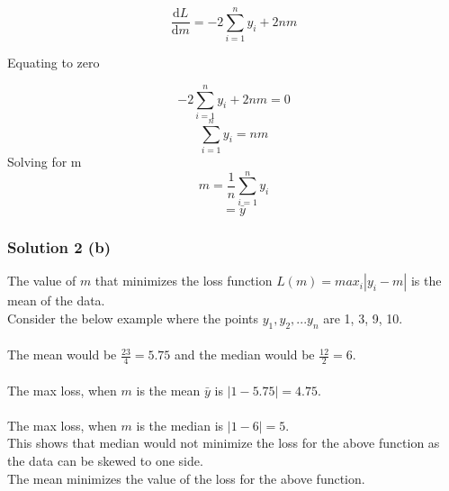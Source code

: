 \documentclass{assignment}
\begin{document}
\begin{problem}
\begin{equation}
    \frac{\mathrm{d}L}{\mathrm{d}m} = -2\sum_{i=1}^{n}y_i+2nm
\end{equation}

\noindent Equating to zero

\begin{equation}
    -2\sum_{i=1}^{n}y_i+2nm = 0
\end{equation}
\begin{equation}
    \sum_{i=1}^{n}y_i = nm
\end{equation}
Solving for m
\begin{equation}
    m = \frac{1}{n}\sum_{i=1}^{n}y_i
\end{equation}
\begin{equation}
    = \bar{y}
\end{equation}


\subsubsection*{Solution 2 (b)}
\noindent The value of $m$ that minimizes the loss function $L(m) = max_i|y_i-m|$ is the mean of the data. 
\\
Consider the below example where the points $y_1, y_2,...y_n$ are 1, 3, 9, 10.
\\
\\
The mean would be $\frac{23}{4} = 5.75$ and the median would be $\frac{12}{2} = 6$.
\\
\\
The max loss, when $m$ is the mean $\bar y$ is $|1 - 5.75| = 4.75.$
\\
\\
The max loss, when $m$ is the median is $|1 - 6| = 5$. 
\\
This shows that median would not minimize the loss for the above function as the data can be skewed to one side. \\
The mean minimizes the value of the loss for the above function.



\end{problem}
\end{document}
